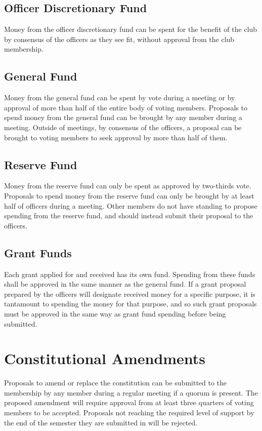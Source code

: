 \documentclass{article}
\begin{document}
\subsection{Officer Discretionary Fund}

Money from the officer discretionary fund can be spent for the benefit of the
club by consensus of the officers as they see fit, without approval from the
club membership.

\subsection{General Fund}

Money from the general fund can be spent by vote during a meeting or by approval
of more than half of the entire body of voting members. Proposals to spend money
from the general fund can be brought by any member during a meeting. Outside of
meetings, by consensus of the officers, a proposal can be brought to voting
members to seek approval by more than half of them.

\subsection{Reserve Fund}

Money from the reserve fund can only be spent as approved by two-thirds vote.
Proposals to spend money from the reserve fund can only be brought by at least
half of officers during a meeting. Other members do not have standing to propose
spending from the reserve fund, and should instead submit their proposal to the
officers.

\subsection{Grant Funds}

Each grant applied for and received has its own fund. Spending from these funds
shall be approved in the same manner as the general fund. If a grant proposal
prepared by the officers will designate received money for a specific purpose,
it is tantamount to spending the money for that purpose, and so such grant
proposals must be approved in the same way as grant fund spending before being
submitted.

\section{Constitutional Amendments}

Proposals to amend or replace the constitution can be submitted to the
membership by any member during a regular meeting if a quorum is present. The
proposed amendment will require approval from at least three quarters of voting
members to be accepted. Proposals not reaching the required level of support by
the end of the semester they are submitted in will be rejected.
\end{document}
